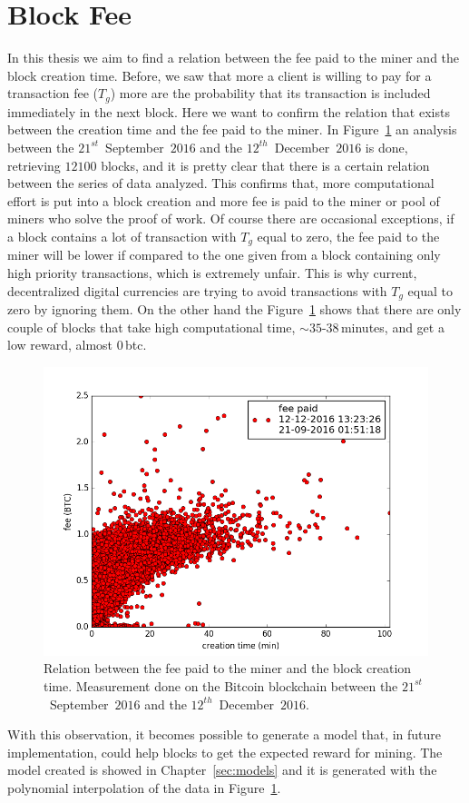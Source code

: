 \documentclass[USenglish]{uit-thesis}
\begin{document}
\section{Block Fee}
\label{sec:block-fee}
In this thesis we aim to find a relation between
the fee paid to the miner and the block creation time. Before, we saw
that more a client is willing to pay for a transaction fee ($T_g$) more are
the probability that its transaction is included immediately in the next block.
Here we want to confirm the relation that exists between the creation time
and the fee paid to the miner. In Figure~\ref{fig:fee_bandwidth} an analysis
between the $21^{st}$~September~$2016$ and the $12^{th}$~December~$2016$
is done, retrieving $12100$ blocks, and it is pretty clear that there is a certain
relation between the series of data analyzed. This confirms that,
more computational effort is put into a block creation and more fee
is paid to the miner or pool of miners who solve the proof of work.
Of course there are occasional exceptions, if a block contains a lot of transaction
with $T_g$ equal to zero, the fee paid to the miner will be lower if compared to
the one given from a block containing only high priority transactions, which is extremely unfair.
This is why current, decentralized digital currencies are trying to avoid transactions
with $T_g$ equal to zero by ignoring them. On the other hand the Figure~\ref{fig:fee_bandwidth}
shows that there are only couple of blocks that take high computational time, $\sim35$-$38$\,minutes, and get
a low reward, almost $0$\,\gls{btc}.
\begin{figure}[H]
	\centering
	\includegraphics[width=1\textwidth]{img/fee_bandwidth}
	\caption{Relation between the fee paid to the miner and the block creation time.
		Measurement done on the Bitcoin blockchain between
		the $21^{st}$~September~$2016$ and the $12^{th}$~December~$2016$.}
	\label{fig:fee_bandwidth}
\end{figure}
With this observation, it becomes possible to generate a model that,
in future implementation, could help blocks to get the expected reward for mining. The model
created is showed in Chapter~\ref{sec:models} and it is generated with the
polynomial interpolation of the data in Figure~\ref{fig:fee_bandwidth}.
\end{document}

